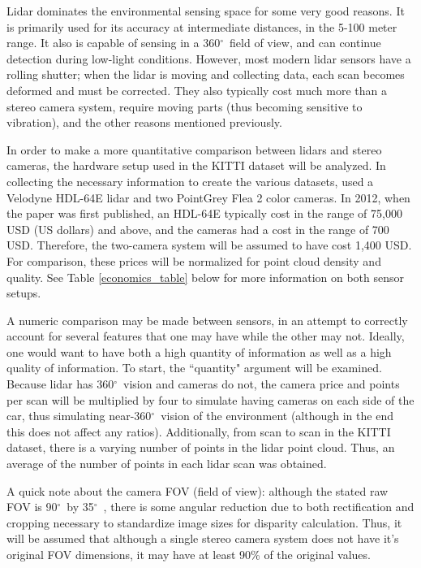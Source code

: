 \def \deg {$ ^{\circ}$\ } %
Lidar dominates the environmental sensing space for some very good reasons. It is primarily used for its accuracy at intermediate distances, in the 5-100 meter range. It also is capable of sensing in a 360\deg field of view, and can continue detection during low-light conditions. However, most modern lidar sensors have a rolling shutter; when the lidar is moving and collecting data, each scan becomes deformed and must be corrected. They also typically cost much more than a stereo camera system, require moving parts (thus becoming sensitive to vibration), and the other reasons mentioned previously.

In order to make a more quantitative comparison between lidars and stereo cameras, the hardware setup used in the KITTI dataset will be analyzed. In collecting the necessary information to create the various datasets, \cite{geiger_are_2012} used a Velodyne HDL-64E lidar and two PointGrey Flea 2 color cameras. In 2012, when the paper was first published, an HDL-64E typically cost in the range of 75,000 USD (US dollars) and above, and the cameras had a cost in the range of 700 USD. Therefore, the two-camera system will be assumed to have cost 1,400 USD. For comparison, these prices will be normalized for point cloud density and quality. See Table \ref{economics_table} below for more information on both sensor setups.

A numeric comparison may be made between sensors, in an attempt to correctly account for several features that one may have while the other may not. Ideally, one would want to have both a high quantity of information as well as a high quality of information. To start, the ``quantity" argument will be examined. Because lidar has 360\deg vision and cameras do not, the camera price and points per scan will be multiplied by four to simulate having cameras on each side of the car, thus simulating near-360\deg vision of the environment (although in the end this does not affect any ratios). Additionally, from scan to scan in the KITTI dataset, there is a varying number of points in the lidar point cloud. Thus, an average of the number of points in each lidar scan was obtained.

A quick note about the camera FOV (field of view): although the stated raw FOV is 90\deg by 35\deg, there is some angular reduction due to both rectification and cropping necessary to standardize image sizes for disparity calculation. Thus, it will be assumed that although a single stereo camera system does not have it's original FOV dimensions, it may have at least 90\% of the original values.

